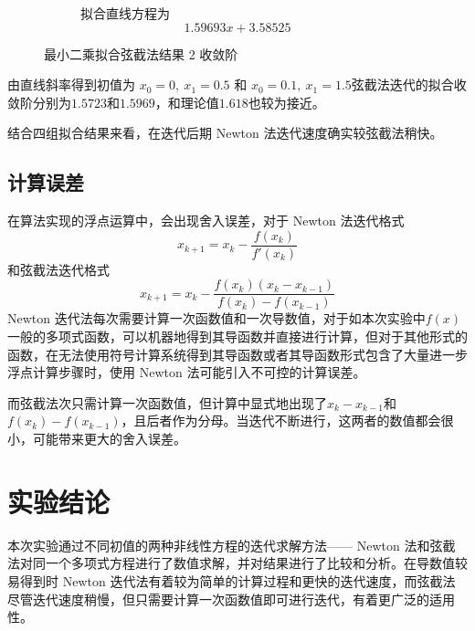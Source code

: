 \documentclass[11pt]{article}
\begin{document}
\begin{figure}[h]
\begin{subfigure}{.49\textwidth}
        \label{figure:Secant-LS2}
    \end{subfigure}
    \begin{subfigure}{.49\textwidth}
        \centering
        拟合直线方程为
        \begin{equation*}
            1.59693 x+3.58525
        \end{equation*}
    \end{subfigure}
    \caption{最小二乘拟合弦截法结果 2 收敛阶}
    \label{Secant-LS2}
\end{figure}
由直线斜率得到初值为 $x_0 = 0,\ x_1 = 0.5$ 和 $x_0 = 0.1,\ x_1 = 1.5$弦截法迭代的拟合收敛阶分别为$1.5723$和$1.5969$，和理论值$1.618$也较为接近。

结合四组拟合结果来看，在迭代后期 Newton 法迭代速度确实较弦截法稍快。
\subsection{计算误差}
在算法实现的浮点运算中，会出现舍入误差，对于 Newton 法迭代格式
\begin{equation}
    x_{k + 1} = x_k - \frac{f(x_k)}{f'(x_k)} \tag{6}
\end{equation}
和弦截法迭代格式
\begin{equation*}
    x_{k + 1} = x_k - \frac{f(x_k)(x_k - x_{k - 1})}{f(x_k) - f(x_{k - 1})} \tag{1}
\end{equation*}
Newton 迭代法每次需要计算一次函数值和一次导数值，对于如本次实验中$f(x)$一般的多项式函数，可以机器地得到其导函数并直接进行计算，但对于其他形式的函数，在无法使用符号计算系统得到其导函数或者其导函数形式包含了大量进一步浮点计算步骤时，使用 Newton 法可能引入不可控的计算误差。

而弦截法次只需计算一次函数值，但计算中显式地出现了$x_k - x_{k - 1}$和$f(x_k) - f(x_{k - 1})$，且后者作为分母。当迭代不断进行，这两者的数值都会很小，可能带来更大的舍入误差。

\section{实验结论}
本次实验通过不同初值的两种非线性方程的迭代求解方法—— Newton 法和弦截法对同一个多项式方程进行了数值求解，并对结果进行了比较和分析。在导数值较易得到时 Newton 迭代法有着较为简单的计算过程和更快的迭代速度，而弦截法尽管迭代速度稍慢，但只需要计算一次函数值即可进行迭代，有着更广泛的适用性。



\end{document}
